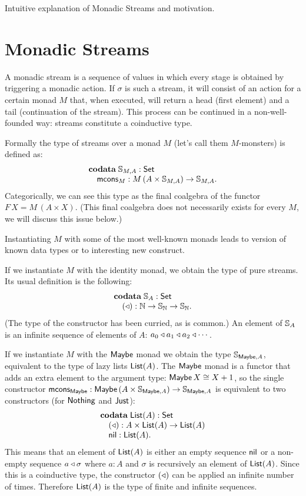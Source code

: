 \documentclass{article}
\begin{document}
Intuitive explanation of Monadic Streams and motivation.

\section{Monadic Streams}

A monadic stream is a sequence of values in which every stage is obtained by triggering a monadic action.
If $\sigma$ is such a stream, it will consist of an action for a certain monad $M$ that, when executed, will return a head (first element) and a tail (continuation of the stream).
This process can be continued in a non-well-founded way: streams constitute a coinductive type.

Formally the type of streams over a monad $M$ (let's call them $M$-monsters) is defined as:
$$
\begin{array}[t]{l}
\mathbf{codata}\;
\mathbb{S}_{M,A}:\mathsf{Set}\\
\quad \mathsf{mcons}_M: M\,(A\times \mathbb{S}_{M,A})\rightarrow\mathbb{S}_{M,A}.
\end{array}
$$
Categorically, we can see this type as the final coalgebra of the functor $F\,X = M\,(A\times X)$. (This final coalgebra does not necessarily exists for every $M$, we will discuss this issue below.)


Instantiating $M$ with some of the most well-known monads leads to version of known data types or to interesting new construct.

If we instantiate $M$ with the identity monad, we obtain the type of pure streams.
Its usual definition is the following:
$$
\begin{array}[t]{l}
\mathbf{codata}\;
\mathbb{S}_{A}:\mathsf{Set}\\
\quad (\triangleleft): \mathbb{N}\rightarrow \mathbb{S}_{\mathbb{N}} \rightarrow\mathbb{S}_{\mathbb{N}}.
\end{array}
$$
(The type of the constructor has been curried, as is common.)
An element of $\mathbb{S}_{A}$ is an infinite sequence of elements of $A$: $a_0 \triangleleft a_1\triangleleft a_2\triangleleft \cdots$.

If we instantiate $M$ with the $\mathsf{Maybe}$ monad we obtain the type $\mathbb{S}_{\mathsf{Maybe},A}$, equivalent to the type of lazy lists $\mathsf{List}(A)$.
The $\mathsf{Maybe}$ monad is a functor that adds an extra element to the argument type: $\mathsf{Maybe}\,X \cong X+1$, so the single constructor $\mathsf{mcons}_{\mathsf{Maybe}}: \mathsf{Maybe}\,(A\times \mathbb{S}_{\mathsf{Maybe},A})\rightarrow\mathbb{S}_{\mathsf{Maybe},A}$ is equivalent to two constructors (for $\mathsf{Nothing}$ and $\mathsf{Just}$):
$$
\begin{array}[t]{l}
\mathbf{codata}\;
\mathsf{List}(A):\mathsf{Set}\\
\quad (\triangleleft): A\times \mathsf{List}(A)\rightarrow\mathsf{List}(A)\\
\quad \mathsf{nil}: \mathsf{List}(A).
\end{array}
$$
This means that an element of $\mathsf{List}(A)$ is either an empty sequence $\mathsf{nil}$ or a non-empty sequence $a\triangleleft \sigma$ where $a:A$ and $\sigma$ is recursively an element of $\mathsf{List}(A)$.
Since this is a coinductive type, the constructor $(\triangleleft)$ can be applied an infinite number of times.
Therefore $\mathsf{List}(A)$ is the type of finite and infinite sequences.
\end{document}
